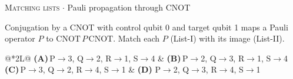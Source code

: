\documentclass[11pt,a4paper]{article}
\newcommand{\optlabel}[1]{\textbf{(#1)}}
\newcommand{\correctlabel}[1]{\textcolor{okgreen}{\textbf{(#1)}\,\ding{51}}}
\newenvironment{qitem}[1]{\begin{list}{}{\setlength{\leftmargin}{3.3em}\setlength{\labelwidth}{3.1em}%
  \setlength{\labelsep}{0.2em}\setlength{\topsep}{3pt}\setlength{\parsep}{3pt}}\item[\textbf{Q.#1}\hfill]}{\end{list}}
\newcommand{\qmeta}[2]{{\footnotesize\color{black!60}\textsc{#1} \;$\cdot$\; #2}\par}
\begin{document}
\begin{qitem}{27}
\qmeta{Matching lists}{Pauli propagation through CNOT}
Conjugation by a CNOT with control qubit 0 and target qubit 1 maps a Pauli operator $P$ to
$\mathrm{CNOT}\,P\,\mathrm{CNOT}$. Match each $P$ (List-I) with its image (List-II).
\par\smallskip{}
\par\smallskip\noindent\begin{tabularx}{\linewidth}{@{}*{2}{L}@{}}
\optlabel{A}\,P$\to$3, Q$\to$2, R$\to$1, S$\to$4 & \optlabel{B}\,P$\to$2, Q$\to$3, R$\to$1, S$\to$4 \\[3pt]
\optlabel{C}\,P$\to$3, Q$\to$2, R$\to$4, S$\to$1 & \correctlabel{D}\,P$\to$2, Q$\to$3, R$\to$4, S$\to$1
\end{tabularx}
\end{qitem}
\end{document}
